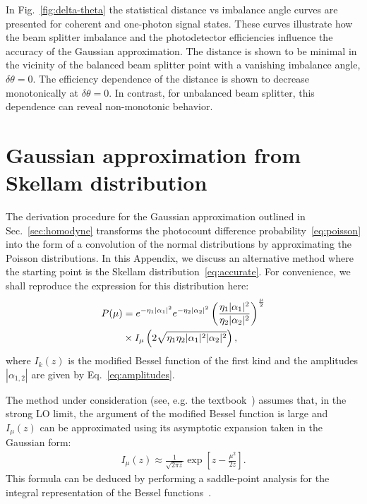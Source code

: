 \documentclass[%
reprint,
superscriptaddress,
 amsmath,amssymb,amsfonts,
 aps,
 pra,
 longbibliography
]{revtex4-2}
\begin{document}
In Fig.~\ref{fig:delta-theta} 
the statistical distance vs imbalance angle
curves are presented for coherent and one-photon signal states. 
These curves illustrate how the beam splitter imbalance and
the photodetector efficiencies influence the accuracy of the
Gaussian approximation.
The distance is shown to be minimal in the vicinity of
the balanced beam splitter point with
a vanishing imbalance angle, $\delta\theta=0$.
The efficiency dependence of
the distance
is shown to decrease monotonically at $\delta\theta=0$.
In contrast, for unbalanced beam splitter, this dependence can
reveal non-monotonic behavior.

\section{Gaussian approximation from Skellam distribution}
\label{sec:appendix_comparison}

The derivation procedure for the Gaussian approximation
outlined in Sec.~\ref{sec:homodyne} transforms
the photocount difference probability~\eqref{eq:poisson}
into the form of a convolution of the normal distributions
by approximating the Poisson distributions.
In this Appendix,
we discuss an alternative method
where the starting point is the Skellam distribution~\eqref{eq:accurate}.
For convenience, we shall reproduce the expression for
this distribution here:
\begin{align}
\label{eq:Skellam}   
  P(\mu)&=e^{-\eta_1|\alpha_1|^2}e^{-\eta_2|\alpha_2|^2}
  \left(\frac{\eta_1|\alpha_1|^2}{\eta_2|\alpha_2|^2}\right)^{\frac{\mu}{2}}
  \notag
  \\
  &
  \times
I_{\mu}\left(2\sqrt{\eta_1\eta_2|\alpha_1|^2|\alpha_2|^2}\right),
\end{align}
where $I_k(z)$ is the modified Bessel function of the first kind
and the amplitudes $|\alpha_{1,2}|$ are given by Eq.~\eqref{eq:amplitudes}.

The method under consideration
(see, e.g. the textbook~\cite{Vogel:bk:2006})
assumes that,
in the strong LO limit, the argument of the modified Bessel function is large
and $I_\mu(z)$ can be
approximated using its asymptotic expansion
taken in the Gaussian form:
\begin{align}
  \label{eq:asymp-A}
  I_\mu(z)\approx\frac{1}{\sqrt{2\pi z}}\exp\left[z-\frac{\mu^2}{2 z}\right].
\end{align}
This formula can be deduced by
performing a saddle-point analysis
for the integral representation of
the Bessel functions~\cite{freyberger1993photon}.
\end{document}
